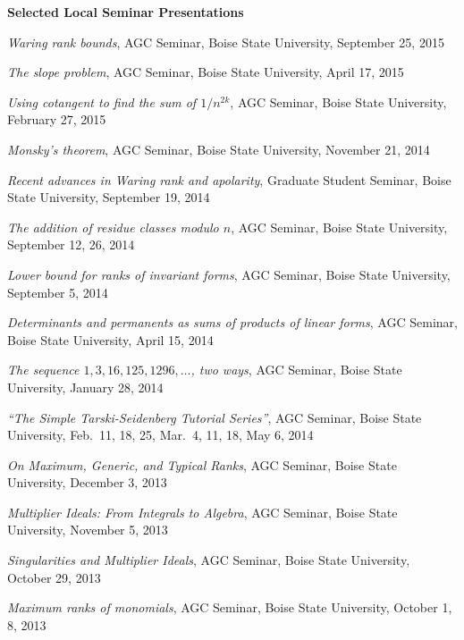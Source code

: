 \documentclass[12pt]{article}
\begin{document}
\textbf{Selected Local Seminar Presentations}
\begin{description}
\setlength{}
\item[] \textit{Waring rank bounds},
AGC Seminar, Boise State University, September 25, 2015
\item[] \textit{The slope problem},
AGC Seminar, Boise State University, April 17, 2015
\item[] \textit{Using cotangent to find the sum of $1/n^{2k}$},
AGC Seminar, Boise State University, February 27, 2015
\item[] \textit{Monsky's theorem},
AGC Seminar, Boise State University, November 21, 2014
\item[] \textit{Recent advances in Waring rank and apolarity},
Graduate Student Seminar, Boise State University, September 19, 2014
\item[] \textit{The addition of residue classes modulo $n$},
AGC Seminar, Boise State University, September 12, 26, 2014
\item[] \textit{Lower bound for ranks of invariant forms},
AGC Seminar, Boise State University, September 5, 2014
\item[] \textit{Determinants and permanents as sums of products of linear forms},
AGC Seminar, Boise State University, April 15, 2014
\item[] \textit{The sequence $1, 3, 16, 125, 1296, \dotsc$, two ways},
AGC Seminar, Boise State University, January 28, 2014
\item[] \textit{``The Simple Tarski-Seidenberg Tutorial Series''},
AGC Seminar, Boise State University, Feb.~11, 18, 25, Mar.~4, 11, 18, May 6, 2014
\item[] \textit{On Maximum, Generic, and Typical Ranks},
AGC Seminar, Boise State University, December 3, 2013
\item[] \textit{Multiplier Ideals: From Integrals to Algebra},
AGC Seminar, Boise State University, November 5, 2013
\item[] \textit{Singularities and Multiplier Ideals},
AGC Seminar, Boise State University, October 29, 2013
\item[] \textit{Maximum ranks of monomials},
AGC Seminar, Boise State University, October 1, 8, 2013

\end{description}
\end{document}
